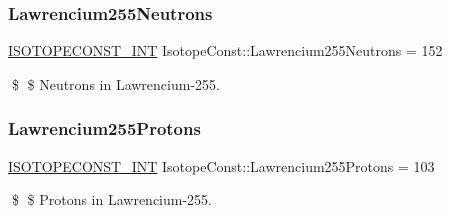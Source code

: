\subsubsection{\texorpdfstring{Lawrencium255\+Neutrons}{Lawrencium255Neutrons}}
{\footnotesize\ttfamily \mbox{\hyperlink{group___isotope_const-_macros_ga5f18360b3e99483a35c32d789e62621c}{I\+S\+O\+T\+O\+P\+E\+C\+O\+N\+S\+T\+\_\+\+I\+NT}} Isotope\+Const\+::\+Lawrencium255\+Neutrons = 152}

\$ \$ Neutrons in Lawrencium-\/255. \mbox{\label{group___isotope_const-_lawrencium-_lr255_gae74e0dc4f7f2dc44c17a97e353473c77}} 
\subsubsection{\texorpdfstring{Lawrencium255\+Protons}{Lawrencium255Protons}}
{\footnotesize\ttfamily \mbox{\hyperlink{group___isotope_const-_macros_ga5f18360b3e99483a35c32d789e62621c}{I\+S\+O\+T\+O\+P\+E\+C\+O\+N\+S\+T\+\_\+\+I\+NT}} Isotope\+Const\+::\+Lawrencium255\+Protons = 103}

\$ \$ Protons in Lawrencium-\/255. 